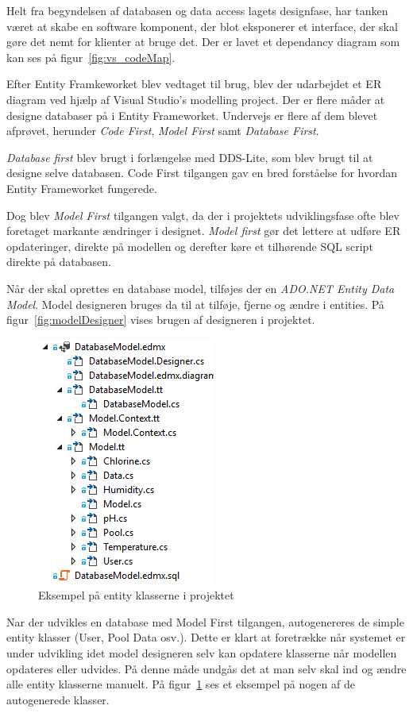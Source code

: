 Helt fra begyndelsen af databasen og data access lagets designfase, har tanken været at skabe en software komponent, der blot eksponerer et interface, der skal gøre det nemt for klienter at bruge det. Der er lavet et dependancy diagram som kan ses på figur~\ref{fig:vs_codeMap}.

Efter Entity Framkeworket blev vedtaget til brug, blev der udarbejdet et ER diagram ved hjælp af Visual Studio's modelling project. Der er flere måder at designe databaser på i Entity Frameworket. Undervejs er flere af dem blevet afprøvet, herunder \textit{Code First}, \textit{Model First} samt \textit{Database First}.

\textit{Database first} blev brugt i forlængelse med DDS-Lite, som blev brugt til at designe selve databasen. Code First tilgangen gav en bred forståelse for hvordan Entity Frameworket fungerede.

Dog blev \textit{Model First} tilgangen valgt, da der i projektets udviklingsfase ofte blev foretaget markante ændringer i designet. \textit{Model first} gør det lettere at udføre ER opdateringer, direkte på modellen og derefter køre et tilhørende SQL script direkte på databasen. 

Når der skal oprettes en database model, tilføjes der en \textit{ADO.NET Entity Data Model}. Model designeren bruges da til at tilføje, fjerne og ændre i entities.
På figur~\ref{fig:modelDesigner} vises brugen af designeren i projektet.

\begin{figure}
\centering
\includegraphics[width=0.3\linewidth]{figs/generatedFiles}
\caption{Eksempel på entity klasserne i projektet}
\label{fig:generatedFiles}
\end{figure}

Nar der udvikles en database med Model First tilgangen, autogenereres de simple entity klasser (User, Pool Data osv.). Dette er klart at foretrække når systemet er under udvikling idet model designeren selv kan opdatere klasserne når modellen opdateres eller udvides. På denne måde undgås det at man selv skal ind og ændre alle entity klasserne manuelt. På figur~\ref{fig:generatedFiles} ses et eksempel på nogen af de autogenerede klasser.

